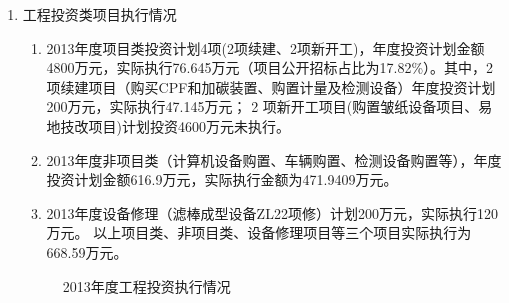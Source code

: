 \begin{enumerate}
 \setlength{\parsep}{0ex} %
 \setlength{\topsep}{1ex} %
 \setlength{\itemsep}{0.5ex} %
  \item 工程投资类项目执行情况
 \begin{enumerate}[1、]
 \item 2013年度项目类投资计划4项(2项续建、2项新开工)，年度投资计划金额4800万元，实际执行76.645万元（项目公开招标占比为17.82\%）。其中，2项续建项目（购买CPF和加碳装置、购置计量及检测设备）年度投资计划200万元，实际执行47.145万元；
     2 项新开工项目(购置皱纸设备项目、易地技改项目)计划投资4600万元未执行。
\item 2013年度非项目类（计算机设备购置、车辆购置、检测设备购置等），年度投资计划金额616.9万元，实际执行金额为471.9409万元。
\item 2013年度设备修理（滤棒成型设备ZL22项修）计划200万元，实际执行120 万元。
以上项目类、非项目类、设备修理项目等三个项目实际执行为668.59万元。
 \end{enumerate}


\begin{figure}[htpb]
\begin{minipage}{0.05\textwidth}
 \end{minipage}
\hfill
\begin{minipage}{0.85\textwidth}
\begin{flushleft}
\end{flushleft}
%
\vskip 3cm
%
 \begin{flushleft}
\end{flushleft}
 \end{minipage}
\vskip 6cm
\caption{2013年度工程投资执行情况}
\end{figure}


\end{enumerate}
